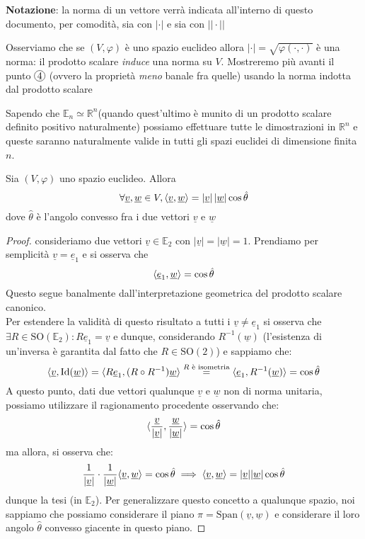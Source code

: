\noindent \textbf{Notazione}: la norma di un vettore verrà indicata all'interno di questo documento, per comodità, sia con $|\cdot|$ e sia con $||\cdot||$
\begin{remark}
Osserviamo che se $(V, \varphi)$ è uno spazio euclideo allora $| \cdot | = \sqrt{\varphi(\cdot, \cdot)}$ è una norma: il prodotto scalare \emph{induce} una norma su $V$. Mostreremo più avanti il punto $\circled{4}$ (ovvero la proprietà \emph{meno} banale fra quelle) usando la norma indotta dal prodotto scalare
\end{remark}
\noindent Sapendo che $\mathbb{E}_n \simeq \mathbb{R}^n$(quando quest'ultimo è munito di un prodotto scalare definito positivo naturalmente) possiamo effettuare tutte le dimostrazioni in $\mathbb{R}^n$ e queste saranno naturalmente valide in tutti gli spazi euclidei di dimensione finita $n$. 
\begin{theorem} Sia $(V, \varphi)$ uno spazio euclideo. Allora $$\forall \underline{v}, \underline{w} \in V, \langle \underline{v}, \underline{w} \rangle = |\underline{v}| \, | \underline{w} | \cos{\hat{\theta}}$$
dove $\hat{\theta}$ è l'angolo convesso fra i due vettori $\underline{v}$ e $\underline{w}$
\end{theorem}
\begin{proof}
consideriamo due vettori $\underline{v} \in \mathbb{E}_2$ con $| \underline{v} | = | \underline{w} | = 1$. Prendiamo per semplicità $\underline{v} = \underline{e}_1$ e si osserva che
$$
\langle \underline{e}_1, \underline{w} \rangle = \cos{\hat{\theta}}
$$
Questo segue banalmente dall'interpretazione geometrica del prodotto scalare canonico. \\
Per estendere la validità di questo risultato a tutti i $\underline{v} \neq \underline{e}_1$ si osserva che $\exists R \in \text{SO}(\mathbb{E}_2): R\underline{e}_1 = \underline{v}$ e dunque, considerando $R^{-1}(\underline{w})$ (l'esistenza di un'inversa è garantita dal fatto che $R \in \text{SO}(2)$) e sappiamo che:
$$
\langle \underline{v}, \text{Id}(\underline{w}) \rangle = \langle R \underline{e}_1, (R \circ R^{-1})\underline{w} \rangle \stackrel{R\text{ è isometria}}{=} \langle \underline{e}_1, R^{-1}(\underline{w}) \rangle =  \cos{\hat{\theta}}
$$
A questo punto, dati due vettori qualunque $\underline{v}$ e $\underline{w}$ non di norma unitaria, possiamo utilizzare il ragionamento procedente osservando che:
$$
\langle \frac{\underline{v}}{|\underline{v}|}, \frac{\underline{w}}{|\underline{w}|} \rangle = \cos{\hat{\theta}}
$$
ma allora, si osserva che:
$$
\frac{1}{|\underline{v}|} \cdot \frac{1}{|\underline{w}|} \langle \underline{v}, \underline{w} \rangle = \cos{\hat{\theta}} \implies \langle \underline{v},  \underline{w} \rangle = |\underline{v}| |\underline{w}| \cos{\hat{\theta}}
$$
dunque la tesi (in $\mathbb{E}_2$). Per generalizzare questo concetto a qualunque spazio, noi sappiamo che possiamo considerare il piano $\pi = \text{Span}(\underline{v}, \underline{w})$ e considerare il loro angolo $\hat{\theta}$ convesso giacente in questo piano.
\end{proof}
